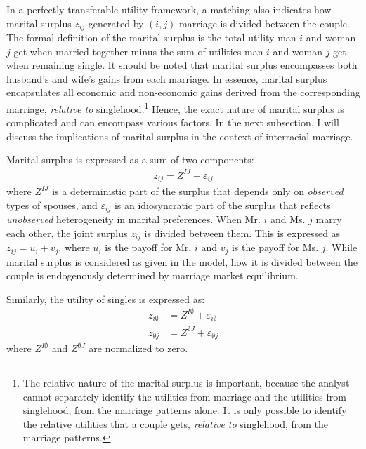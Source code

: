  
In a perfectly transferable utility framework, a matching also indicates how marital surplus $z_{ij}$ generated by $(i,j)$ marriage is divided between the couple. The formal definition of the marital surplus is the total utility man $i$ and woman $j$ get when married together minus the sum of utilities man $i$ and woman $j$ get when remaining single. It should be noted that marital surplus encompasses both husband's and wife's gains from each marriage. In essence, marital surplus encapsulates all economic and non-economic gains derived from the corresponding marriage, \textit{relative to} singlehood.\footnote{The relative nature of the marital surplus is important, because the analyst cannot separately identify the utilities from marriage and the utilities from singlehood, from the marriage patterns alone. It is only possible to identify the relative utilities that a couple gets, \textit{relative to} singlehood, from the marriage patterns.}   Hence, the exact nature of marital surplus is complicated and can encompass various factors. In the next subsection, I will discuss the implications of marital surplus in the context of interracial marriage.


Marital surplus is expressed as a sum of two components:
   \begin{align}
  	z_{ij} = Z^{IJ} + \varepsilon_{ij} \label{eq:zij}
  \end{align}
  where $Z^{IJ}$ is a deterministic part of the surplus that depends only on \textit{observed} types of spouses, and $\varepsilon_{ij}$ is an idiosyncratic part of the surplus that reflects \textit{unobserved} heterogeneity in marital preferences. When Mr. $i$ and Ms. $j$ marry each other, the joint surplus $z_{ij}$ is divided between them. This is expressed as $z_{ij} = u_i + v_j$, where $u_i$ is the payoff for Mr. $i$ and $v_j$ is the payoff for Ms. $j$. While marital surplus is considered as given in the model, how it is divided between the couple is endogenously determined by marriage market equilibrium.

Similarly, the utility of singles is expressed as:
\begin{align*}
	z_{i\emptyset} &= Z^{I\emptyset} + \varepsilon_{i\emptyset} \\
	z_{\emptyset j} &= Z^{\emptyset J} + \varepsilon_{\emptyset j} 
\end{align*}
where $Z^{I\emptyset}$ and $Z^{\emptyset J}$ are normalized to zero. 
 
